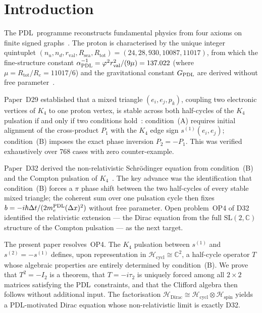 \documentclass[11pt,a4paper]{article}
\theoremstyle{definition}
\newcommand{\PDL}{\textnormal{PDL}}
\newcommand{\Rsea}{R_{\mathrm{sea}}}
\newcommand{\Rtot}{R_{\mathrm{tot}}}
\newcommand{\rval}{r_{\mathrm{val}}}
\newcommand{\hb}{\hbar}
\newcommand{\Ree}{R_e}
\newcommand{\vp}{\varphi}
\newcommand{\aPDL}{\alpha_{\PDL}}
\newcommand{\mePDL}{m_e^{\PDL}}
\newcommand{\Hcycl}{\mathcal{H}_{\mathrm{cycl}}}
\newcommand{\Hspin}{\mathcal{H}_{\mathrm{spin}}}
\newcommand{\HDirac}{\mathcal{H}_{\mathrm{Dirac}}}
\newcommand{\Kfour}{K_4}
\begin{document}
\section{Introduction}
\label{sec:intro}

The \PDL\ programme reconstructs fundamental physics from four axioms on finite signed graphs~\cite{PDL_Main_2026,PDL_Intro_2026}. The proton is characterised by the unique integer quintuplet $(n_u, n_d, \rval, \Rsea, \Rtot) = (24, 28, 930, 10087, 11017)$, from which the fine-structure constant $\aPDL^{-1} = \vp^2 \rval^2/(9\mu) = 137.022$ (where $\mu = \Rtot/\Ree = 11017/6$) and the gravitational constant $G_{\PDL}$ are derived without free parameter~\cite{Combinatorial_Proton_v2_2026,Bridge_PDL_2026,Effective_Sigma_PDL_2026}.

Paper~D29 established that a mixed triangle $(e_i, e_j, p_k)$, coupling two electronic vertices of $\Kfour$ to one proton vertex, is stable across both half-cycles of the $\Kfour$ pulsation if and only if two conditions hold~\cite{PDL_D29_2026}: condition~(A) requires initial alignment of the cross-product $P_1$ with the $\Kfour$ edge sign $s^{(1)}(e_i, e_j)$; condition~(B) imposes the exact phase inversion $P_2 = -P_1$. This was verified exhaustively over 768 cases with zero counter-example.

Paper~D32 derived the non-relativistic Schr\"odinger equation from condition~(B) and the Compton pulsation of $\Kfour$~\cite{PDL_D32_2026}. The key advance was the identification that condition~(B) forces a $\pi$ phase shift between the two half-cycles of every stable mixed triangle; the coherent sum over one pulsation cycle then fixes $b = -i\hb\Delta t/(2\mePDL(\Delta x)^2)$ without free parameter. Open problem~OP4 of D32 identified the relativistic extension --- the Dirac equation from the full $\mathrm{SL}(2,\mathbb{C})$ structure of the Compton pulsation --- as the next target.

The present paper resolves~OP4. The $\Kfour$ pulsation between $s^{(1)}$ and $s^{(2)} = -s^{(1)}$ defines, upon representation in $\Hcycl \cong \mathbb{C}^2$, a half-cycle operator $T$ whose algebraic properties are entirely determined by condition~(B). We prove that $T^2 = -I_2$ is a theorem, that $T = -i\tau_2$ is uniquely forced among all $2\times2$ matrices satisfying the \PDL\ constraints, and that the Clifford algebra then follows without additional input. The factorisation $\HDirac \cong \Hcycl \otimes \Hspin$ yields a \PDL-motivated Dirac equation whose non-relativistic limit is exactly D32.
\end{document}
